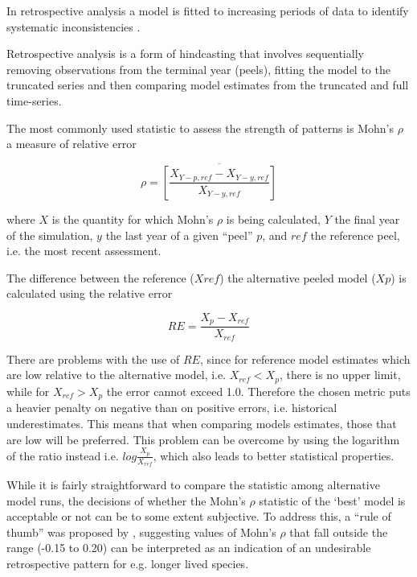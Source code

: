 In retrospective analysis a model is fitted to increasing periods of data to identify systematic inconsistencies \citep{Mohn1999retrospective}.

Retrospective analysis is a form of hindcasting that involves sequentially removing observations from the terminal year (peels), fitting the model to the truncated series and then comparing model estimates from the truncated and full time-series. 


The most commonly used statistic to assess the strength of patterns is Mohn’s $\rho$ a measure of relative error

\begin{equation}\rho = \overline{ \left[ \frac{X_{Y-p,ref}-X_{Y-y,ref}}{X_{Y-y,ref}} \right]}\end{equation}

where $X$ is the quantity for which Mohn’s $\rho$ is being calculated, $Y$ the final year of the simulation, $y$ the last year of a given “peel” $p$, and $ref$ the reference peel, i.e. the most recent assessment.

The difference between the reference ($X{ref}$) the alternative peeled model ($X{p}$) is calculated using the relative error 

\begin{equation} RE=\frac{X_{p}-X_{ref}}{X_{ref}} \end{equation}

There are problems with the use of $RE$, since for reference model estimates which are low relative to the alternative model, i.e. $X_{ref} < X_{p}$, there is no upper limit, while for $X_{ref} > X_{p}$ the error cannot exceed 1.0. Therefore the chosen metric puts a heavier penalty on negative than on positive errors, i.e. historical underestimates. This means that when comparing models estimates, those that are low will be preferred. This problem can be overcome by using the logarithm of the ratio instead i.e. $log\frac{X_{p}}{X_{ref}}$, which also leads to better statistical properties.

While it is fairly straightforward to compare the  statistic among alternative model runs, the decisions of whether the Mohn’s $\rho$ statistic of the ‘best’ model is acceptable or not can be to some extent subjective. To address this, a “rule of thumb” was proposed by \cite{hurtado2014}, suggesting values of Mohn’s $\rho$ that fall outside the range (-0.15 to 0.20) can be interpreted as an indication of an undesirable retrospective pattern for e.g. longer lived species.


    








